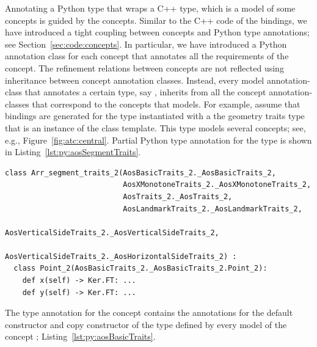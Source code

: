Annotating a Python type that wraps a C++ type, which is a model of some concepts is guided by the concepts. Similar to the C++ code of the bindings, we have introduced a tight coupling between concepts and Python type annotations; see Section~\ref{sec:code:concepts}. In particular, we have introduced a Python annotation class for each concept that annotates all the requirements of the concept. The refinement relations between concepts are not reflected using inheritance between concept annotation classes. 
Instead, every model annotation-class that annotates a certain type, say , inherits from all the concept annotation-classes that correspond to the concepts that  models. For example, assume that bindings are generated for the  type instantiated with a the geometry traits type that is an instance of the  class template. This type models several concepts; see, e.g., Figure~\ref{fig:atc:central}. Partial Python type annotation for the type  is shown in Listing~\ref{lst:py:aosSegmentTraits}.

\begin{lstfloat}
\begin{lstlisting}[style=pythonFramedStyle,basicstyle=\scriptsize,%
                   label={lst:py:aosSegmentTraits},%
                   caption={Partial Python type annotation for the type \pyLstinline{Arr_segment_traits_2}.}]
class Arr_segment_traits_2(AosBasicTraits_2._AosBasicTraits_2,
                           AosXMonotoneTraits_2._AosXMonotoneTraits_2,
                           AosTraits_2._AosTraits_2,
                           AosLandmarkTraits_2._AosLandmarkTraits_2,
                           AosVerticalSideTraits_2._AosVerticalSideTraits_2,
                           AosVerticalSideTraits_2._AosHorizontalSideTraits_2) :
  class Point_2(AosBasicTraits_2._AosBasicTraits_2.Point_2):
    def x(self) -> Ker.FT: ...
    def y(self) -> Ker.FT: ...
\end{lstlisting}
\end{lstfloat}

The type annotation for the concept  contains the annotations for the default constructor and copy constructor of the type  defined by every model of the concept ; Listing~\ref{lst:py:aosBasicTraits}.

